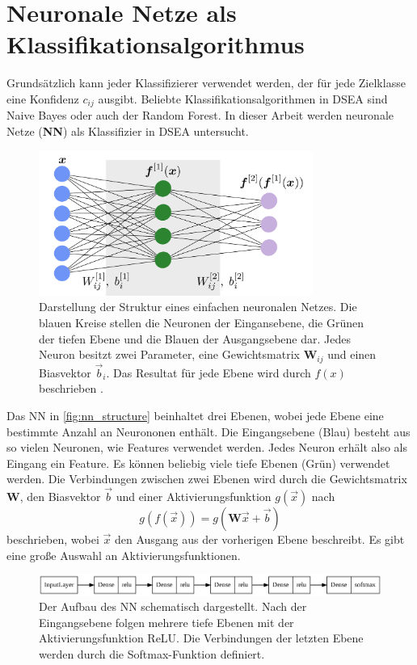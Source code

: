 \section{Neuronale Netze als Klassifikationsalgorithmus} \label{sec:NN}
Grundsätzlich kann jeder Klassifizierer verwendet werden, der für jede Zielklasse eine Konfidenz $c_{ij}$ ausgibt.
Beliebte Klassifikationsalgorithmen in DSEA sind Naive Bayes oder auch der Random Forest.
In dieser Arbeit werden neuronale Netze (\textbf{NN}) als Klassifizier in DSEA untersucht.
\begin{figure}
    \centering
    \includegraphics[width=0.8\textwidth]{Plots/nn_structure.png}
    \caption[Struktur eines NN mit einer tiefen Ebene]{Darstellung der Struktur eines einfachen neuronalen Netzes.
    Die blauen Kreise stellen die Neuronen der Eingansebene, die Grünen der tiefen Ebene und die Blauen der Ausgangsebene dar.
    Jedes Neuron besitzt zwei Parameter, eine Gewichtsmatrix $\mathbf{W}_{ij}$ und einen Biasvektor $\vec{b}_i$.
    Das Resultat für jede Ebene wird durch $f(x)$ beschrieben \cite{Neupert2021IntroductionTM}.
    }
    \label{fig:nn_structure}
\end{figure}
Das NN in \autoref{fig:nn_structure} beinhaltet drei Ebenen, wobei jede Ebene eine bestimmte Anzahl an Neurononen enthält.
Die Eingangsebene (Blau) besteht aus so vielen Neuronen, wie Features verwendet werden.
Jedes Neuron erhält also als Eingang ein Feature.
Es können beliebig viele tiefe Ebenen (Grün) verwendet werden.
Die Verbindungen zwischen zwei Ebenen wird durch die Gewichtsmatrix $\mathbf{W}$, den Biasvektor $\vec{b}$ und einer Aktivierungsfunktion $g(\vec{x})$ nach
\begin{equation*}
    g(f(\vec{x})) = g(\mathbf{W} \vec{x} + \vec{b})
\end{equation*}
beschrieben, wobei $\vec{x}$ den Ausgang aus der vorherigen Ebene beschreibt.
Es gibt eine große Auswahl an Aktivierungsfunktionen\cite{activationf}.
\begin{figure}
    \centering
    \includegraphics[width=\textwidth]{Plots/model_structure.png}
    \caption[Aufbau des verwendeten NN]{Der Aufbau des NN schematisch dargestellt.
    Nach der Eingangsebene folgen mehrere tiefe Ebenen mit der Aktivierungsfunktion ReLU.
    Die Verbindungen der letzten Ebene werden durch die Softmax-Funktion definiert.
    \label{fig:nn_aufbau}
    }
\end{figure}
